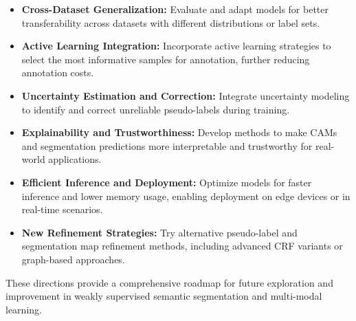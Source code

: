 \begin{itemize}
    \item \textbf{Cross-Dataset Generalization:} Evaluate and adapt models for better transferability across datasets with different distributions or label sets.
    \item \textbf{Active Learning Integration:} Incorporate active learning strategies to select the most informative samples for annotation, further reducing annotation costs.
    \item \textbf{Uncertainty Estimation and Correction:} Integrate uncertainty modeling to identify and correct unreliable pseudo-labels during training.
    \item \textbf{Explainability and Trustworthiness:} Develop methods to make CAMs and segmentation predictions more interpretable and trustworthy for real-world applications.
    \item \textbf{Efficient Inference and Deployment:} Optimize models for faster inference and lower memory usage, enabling deployment on edge devices or in real-time scenarios.
    \item \textbf{New Refinement Strategies:} Try alternative pseudo-label and segmentation map refinement methods, including advanced CRF variants or graph-based approaches.
\end{itemize}

These directions provide a comprehensive roadmap for future exploration and improvement in weakly supervised semantic segmentation and multi-modal learning.